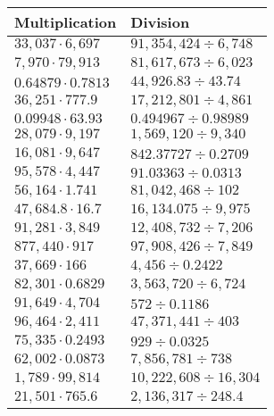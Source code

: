 \begin{longtable}[]{@{}ll@{}}
\toprule
Multiplication & Division\tabularnewline
\midrule
\endhead
\(33,037\cdot6,697\) & \(91,354,424÷6,748\)\tabularnewline
\(7,970\cdot79,913\) & \(81,617,673÷6,023\)\tabularnewline
\(0.64879\cdot0.7813\) & \(44,926.83÷43.74\)\tabularnewline
\(36,251\cdot 777.9\) & \(17,212,801÷4,861\)\tabularnewline
\(0.09948\cdot63.93\) & \(0.494967÷0.98989\)\tabularnewline
\(28,079\cdot9,197\) & \(1,569,120÷9,340\)\tabularnewline
\(16,081\cdot9,647\) & \(842.37727÷0.2709\)\tabularnewline
\(95,578\cdot4,447\) & \(91.03363÷0.0313\)\tabularnewline
\(56,164\cdot1.741\) & \(81,042,468÷102\)\tabularnewline
\(47,684.8\cdot16.7\) & \(16,134.075÷9,975\)\tabularnewline
\(91,281\cdot3,849\) & \(12,408,732÷7,206\)\tabularnewline
\(877,440\cdot917\) & \(97,908,426÷7,849\)\tabularnewline
\(37,669\cdot166\) & \(4,456÷0.2422\)\tabularnewline
\(82,301\cdot0.6829\) & \(3,563,720÷6,724\)\tabularnewline
\(91,649\cdot4,704\) & \(572÷0.1186\)\tabularnewline
\(96,464\cdot2,411\) & \(47,371,441÷403\)\tabularnewline
\(75,335\cdot0.2493\) & \(929÷0.0325\)\tabularnewline
\(62,002\cdot0.0873\) & \(7,856,781÷738\)\tabularnewline
\(1,789\cdot99,814\) & \(10,222,608÷16,304\)\tabularnewline
\(21,501\cdot 765.6\) & \(2,136,317÷248.4\)\tabularnewline
\bottomrule
\end{longtable}
